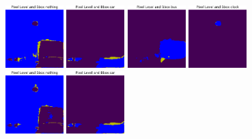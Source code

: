 \begin{figure}[h!tpb]
  \centering
  \includegraphics[width=0.2\textwidth]{../../modelos-entrenados/unet-nonlocal-conv/ejecucion10/predvalmid0}
  \vrule
  \includegraphics[width=0.2\textwidth]{../../modelos-entrenados/unet-nonlocal-conv/ejecucion10/predvalmid3}
  \vrule
  \includegraphics[width=0.2\textwidth]{../../modelos-entrenados/unet-nonlocal-conv/ejecucion10/predvalmid6}
  \vrule
  \includegraphics[width=0.2\textwidth]{../../modelos-entrenados/unet-nonlocal-conv/ejecucion10/predvalmid85}
  \vrule
  \includegraphics[width=0.2\textwidth]{../../modelos-entrenados/unet-nonlocalextra-conv/ejecucion9/predvalmid0}
  \vrule
  \includegraphics[width=0.2\textwidth]{../../modelos-entrenados/unet-nonlocalextra-conv/ejecucion9/predvalmid3}

\end{figure}
